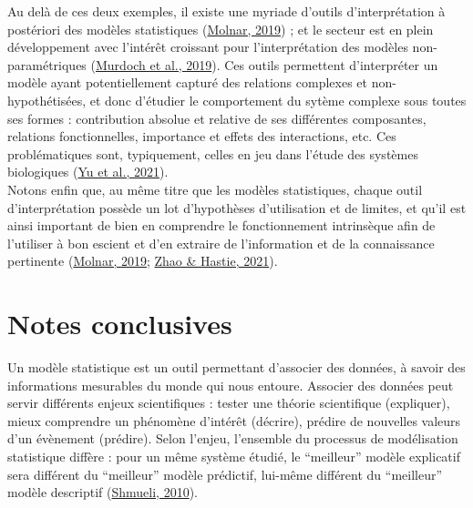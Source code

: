 \documentclass[12pt,twoside]{reedthesis}
\begin{document}
Au delà de ces deux exemples, il existe une myriade d'outils d'interprétation à postériori des modèles statistiques (\protect\hyperlink{ref-molnar_interpretable_2019}{Molnar, 2019}) ; et le secteur est en plein développement avec l'intérêt croissant pour l'interprétation des modèles non-paramétriques (\protect\hyperlink{ref-murdoch_definitions_2019}{Murdoch et al., 2019}). Ces outils permettent d'interpréter un modèle ayant potentiellement capturé des relations complexes et non-hypothétisées, et donc d'étudier le comportement du sytème complexe sous toutes ses formes : contribution absolue et relative de ses différentes composantes, relations fonctionnelles, importance et effets des interactions, etc. Ces problématiques sont, typiquement, celles en jeu dans l'étude des systèmes biologiques (\protect\hyperlink{ref-yu_study_2021}{Yu et al., 2021}).\\

Notons enfin que, au même titre que les modèles statistiques, chaque outil d'interprétation possède un lot d'hypothèses d'utilisation et de limites, et qu'il est ainsi important de bien en comprendre le fonctionnement intrinsèque afin de l'utiliser à bon escient et d'en extraire de l'information et de la connaissance pertinente (\protect\hyperlink{ref-molnar_interpretable_2019}{Molnar, 2019}; \protect\hyperlink{ref-zhao_causal_2021}{Zhao \& Hastie, 2021}).

\hypertarget{notes-conclusives}{%
\section{Notes conclusives}\label{notes-conclusives}}

Un modèle statistique est un outil permettant d'associer des données, à savoir des informations mesurables du monde qui nous entoure. Associer des données peut servir différents enjeux scientifiques : tester une théorie scientifique (expliquer), mieux comprendre un phénomène d'intérêt (décrire), prédire de nouvelles valeurs d'un évènement (prédire). Selon l'enjeu, l'ensemble du processus de modélisation statistique diffère : pour un même système étudié, le ``meilleur'' modèle explicatif sera différent du ``meilleur'' modèle prédictif, lui-même différent du ``meilleur'' modèle descriptif (\protect\hyperlink{ref-shmueli_explain_2010}{Shmueli, 2010}).\\
\end{document}
